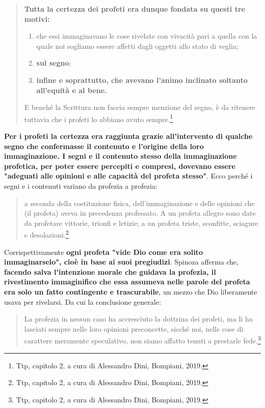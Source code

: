 \begin{quotation}
	\small \textbf{Tutta la certezza dei profeti era dunque fondata su questi tre motivi: }
	\begin{enumerate}
		\item che essi
		immaginavano le cose rivelate con vivacità pari a quella con la quale noi sogliamo essere affetti
		dagli oggetti allo stato di veglia;
		\item \textbf{sul segno};
		\item \textbf{infine e soprattutto, che avevano l'animo inclinato
		soltanto all'equità e al bene.}
	\end{enumerate}
	
	E benché la Scrittura non faccia sempre menzione del segno, è da
	ritenere tuttavia che i profeti lo abbiano avuto sempre.\footnote{Ttp, capitolo 2, a cura di Alessandro Dini, Bompiani, 2019.}
\end{quotation}

\textbf{Per i profeti la certezza era raggiunta
 grazie all'intervento di qualche segno che confermasse il contenuto e l'origine della loro
immaginazione. I segni e il contenuto stesso della
immaginazione profetica, per poter essere percepiti e compresi, dovevano essere "adeguati alle
opinioni e alle capacità del profeta stesso"}. Ecco perché i segni e i contenuti variano da profezia a
profezia:

\begin{quotation}
	\small a seconda della costituzione fisica, dell'immaginazione e delle opinioni che (il profeta)
	aveva in precedenza professato. A un profeta allegro sono date da profetare vittorie, trionfi e
	letizie; a un profeta triste, sconfitte, sciagure e desolazioni.\footnote{Ttp, capitolo 2, a cura di Alessandro Dini, Bompiani, 2019.}
\end{quotation}

Corrispettivamente \textbf{ogni profeta "vide Dio come era solito immaginarselo", cioè in base ai suoi
pregiudizi}. Spinoza afferma che, \textbf{facendo salva l'intenzione morale che guidava la profezia, il rivestimento immaginifico che essa assumeva nelle parole del profeta era solo un
fatto contingente e trascurabile}, un mezzo che Dio liberamente usava per rivelarsi. Da cui la
conclusione generale: 

\begin{quotation}
	\small La profezia in nessun caso ha accresciuto la dottrina dei profeti, ma li ha
	lasciati sempre nelle loro opinioni preconcette, sicché noi, nelle cose di carattere meramente
	speculativo, non siamo affatto tenuti a prestarle fede.\footnote{Ttp, capitolo 2, a cura di Alessandro Dini, Bompiani, 2019.}
\end{quotation}

